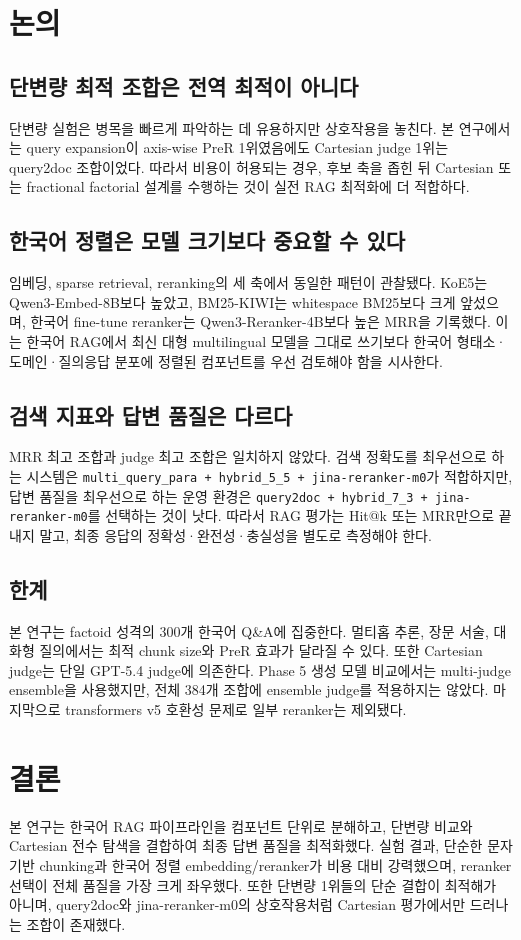 \documentclass[10pt,a4paper,twocolumn]{article}
\newcommand{\code}[1]{\texttt{#1}}
\begin{document}
\section{논의}
\subsection{단변량 최적 조합은 전역 최적이 아니다}
단변량 실험은 병목을 빠르게 파악하는 데 유용하지만 상호작용을 놓친다. 본 연구에서는 query expansion이 axis-wise PreR 1위였음에도 Cartesian judge 1위는 query2doc 조합이었다. 따라서 비용이 허용되는 경우, 후보 축을 좁힌 뒤 Cartesian 또는 fractional factorial 설계를 수행하는 것이 실전 RAG 최적화에 더 적합하다.

\subsection{한국어 정렬은 모델 크기보다 중요할 수 있다}
임베딩, sparse retrieval, reranking의 세 축에서 동일한 패턴이 관찰됐다. KoE5는 Qwen3-Embed-8B보다 높았고, BM25-KIWI는 whitespace BM25보다 크게 앞섰으며, 한국어 fine-tune reranker는 Qwen3-Reranker-4B보다 높은 MRR을 기록했다. 이는 한국어 RAG에서 최신 대형 multilingual 모델을 그대로 쓰기보다 한국어 형태소·도메인·질의응답 분포에 정렬된 컴포넌트를 우선 검토해야 함을 시사한다.

\subsection{검색 지표와 답변 품질은 다르다}
MRR 최고 조합과 judge 최고 조합은 일치하지 않았다. 검색 정확도를 최우선으로 하는 시스템은 \code{multi\_query\_para + hybrid\_5\_5 + jina-reranker-m0}가 적합하지만, 답변 품질을 최우선으로 하는 운영 환경은 \code{query2doc + hybrid\_7\_3 + jina-reranker-m0}를 선택하는 것이 낫다. 따라서 RAG 평가는 Hit@k 또는 MRR만으로 끝내지 말고, 최종 응답의 정확성·완전성·충실성을 별도로 측정해야 한다.

\subsection{한계}
본 연구는 factoid 성격의 300개 한국어 Q\&A에 집중한다. 멀티홉 추론, 장문 서술, 대화형 질의에서는 최적 chunk size와 PreR 효과가 달라질 수 있다. 또한 Cartesian judge는 단일 GPT-5.4 judge에 의존한다. Phase 5 생성 모델 비교에서는 multi-judge ensemble을 사용했지만, 전체 384개 조합에 ensemble judge를 적용하지는 않았다. 마지막으로 transformers v5 호환성 문제로 일부 reranker는 제외됐다.

\section{결론}
본 연구는 한국어 RAG 파이프라인을 컴포넌트 단위로 분해하고, 단변량 비교와 Cartesian 전수 탐색을 결합하여 최종 답변 품질을 최적화했다. 실험 결과, 단순한 문자 기반 chunking과 한국어 정렬 embedding/reranker가 비용 대비 강력했으며, reranker 선택이 전체 품질을 가장 크게 좌우했다. 또한 단변량 1위들의 단순 결합이 최적해가 아니며, query2doc와 jina-reranker-m0의 상호작용처럼 Cartesian 평가에서만 드러나는 조합이 존재했다.
\end{document}
